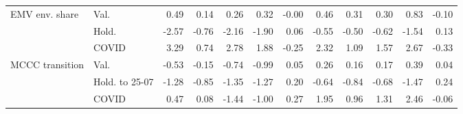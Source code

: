 \begin{table}[htbp]
\begin{tabular}{llrrrrrrrrrr}
EMV env. share & Val. & 0.49 & 0.14 & 0.26 & 0.32 & -0.00 & 0.46 & 0.31 & 0.30 & 0.83 & -0.10 \\
 & Hold. & -2.57 & -0.76 & -2.16 & -1.90 & 0.06 & -0.55 & -0.50 & -0.62 & -1.54 & 0.13 \\
 & COVID & 3.29 & 0.74 & 2.78 & 1.88 & -0.25 & 2.32 & 1.09 & 1.57 & 2.67 & -0.33 \\
MCCC transition & Val. & -0.53 & -0.15 & -0.74 & -0.99 & 0.05 & 0.26 & 0.16 & 0.17 & 0.39 & 0.04 \\
 & Hold. to 25-07 & -1.28 & -0.85 & -1.35 & -1.27 & 0.20 & -0.64 & -0.84 & -0.68 & -1.47 & 0.24 \\
 & COVID & 0.47 & 0.08 & -1.44 & -1.00 & 0.27 & 1.95 & 0.96 & 1.31 & 2.46 & -0.06 \\
\bottomrule
\end{tabular}
\end{table}
